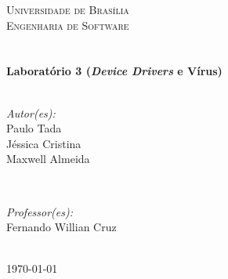 \begin{titlepage}

\center %
 

\textsc{\LARGE Universidade de Brasília}\\[1.5cm]	%
\textsc{\Large Engenharia de Software}\\[0.5cm]		%
\textsc{\large }\\[0.5cm]		%


\HRule \\[0.4cm]
{ \huge \bfseries Laboratório 3 (\textit{Device Drivers} e Vírus)}\\[0.4cm] %
\HRule \\[1.5cm]
 

\begin{minipage}{0.4\textwidth}
\begin{flushleft} \large
\emph{Autor(es):}\\
Paulo Tada \\ %
Jéssica Cristina\\
Maxwell Almeida\\
\end{flushleft}
\end{minipage}
~
\begin{minipage}{0.4\textwidth}
\begin{flushright} \large
\emph{Professor(es):} \\
Fernando Willian Cruz %
\end{flushright}
\end{minipage}\\[4cm]


{\large \today}\\[3cm] %



\vfill %

\end{titlepage}
